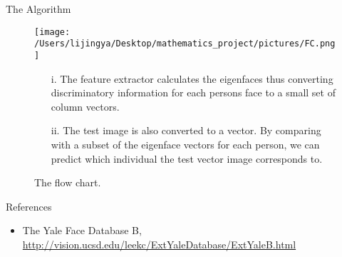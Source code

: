 \documentclass[final]{beamer}
\newlength{\onecolwid}
\newcommand{\omitt}[1]{}
\begin{document}
\begin{frame}[t]
\begin{columns}[t]
\begin{column}{\onecolwid}
\begin{block}
\end{block}

\begin{block}{The Algorithm}
\begin{figure}[h]
\centering
\texttt{[image: /Users/lijingya/Desktop/mathematics\_project/pictures/FC.png]}
\caption{ The flow chart.}
\begin{itemize}
\item[i.] The feature extractor calculates the eigenfaces thus converting discriminatory information for each persons face to a small set of column vectors. 
\item[ii.] The test image is also converted to a vector. By comparing with a subset of the eigenface vectors for each person, we can predict which individual the test vector image corresponds to.

\end{itemize}
\end{figure}

\end{block}

\vspace{-8mm}

\omitt{

\setbeamercolor{block title}{fg=red,bg=white} %

\begin{block}{Acknowledgements}

\end{block}

\vspace{-8mm}}


\begin{block}{References}
\begin{itemize}
\item The Yale Face Database B,\\ \url{http://vision.ucsd.edu/leekc/ExtYaleDatabase/ExtYaleB.html}
\end{itemize}


\end{block}

\end{column} %

\end{columns} %

\end{frame} %
\end{document}
